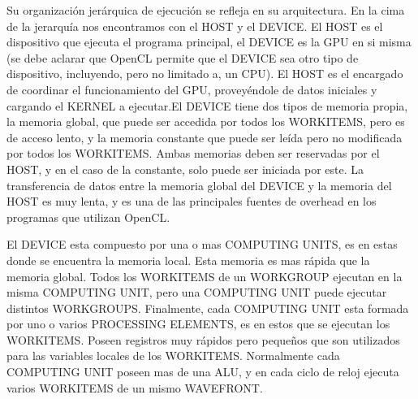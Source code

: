 Su organización jerárquica de ejecución se refleja en su arquitectura. En la
cima de la jerarquía nos encontramos con el HOST y el DEVICE. El HOST es el
dispositivo que ejecuta el programa principal, el DEVICE es la GPU en si misma
(se debe aclarar que OpenCL permite que el DEVICE sea otro tipo de dispositivo,
incluyendo, pero no limitado a, un CPU). El HOST es el encargado de coordinar el
funcionamiento del GPU, proveyéndole de datos iniciales y cargando el KERNEL a
ejecutar.El DEVICE tiene dos tipos de memoria propia, la memoria global, que
puede ser accedida por todos los WORKITEMS, pero es de acceso lento, y la
memoria constante que puede ser leída pero no modificada por todos los
WORKITEMS. Ambas memorias deben ser reservadas por el HOST, y en el caso de la
constante, solo puede ser iniciada por este. La transferencia de datos entre la
memoria global del DEVICE y la memoria del HOST es muy lenta, y es una de las
principales fuentes de overhead en los programas que utilizan OpenCL.

El DEVICE esta compuesto por una o mas COMPUTING UNITS, es en estas donde se
encuentra la memoria local. Esta memoria es mas rápida que la memoria global.
Todos los WORKITEMS de un WORKGROUP ejecutan en la misma COMPUTING UNIT, pero
una COMPUTING UNIT puede ejecutar distintos WORKGROUPS. Finalmente, cada
COMPUTING UNIT esta formada por uno o varios PROCESSING ELEMENTS, es en estos
que se ejecutan los WORKITEMS. Poseen registros muy rápidos pero pequeños que
son utilizados para las variables locales de los WORKITEMS. Normalmente cada
COMPUTING UNIT poseen mas de una ALU, y en cada ciclo de reloj ejecuta varios
WORKITEMS de un mismo WAVEFRONT.
